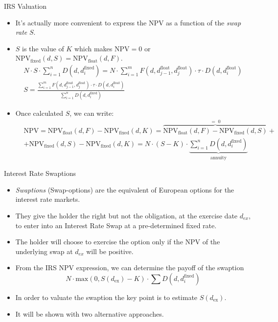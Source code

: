 \documentclass{beamer}
\begin{document}
\begin{frame}{IRS Valuation}
	\begin{itemize}	
	\item It's actually more convenient to express the NPV as a function of the \emph{swap rate} $S$.
	\item $S$ is the value of $K$ which makes $\mathrm{NPV}=0$ or 		$\mathrm{NPV}_{\mathrm{fixed}}(d, S) = \mathrm{NPV}_{\mathrm{float}}(d, F)$.
	\begin{equation*}
		\begin{gathered}
		N\cdot S\cdot\sum_{i=1}^{n}D(d, d_{i}^{\mathrm{fixed}}) = N\cdot\sum_{i=1}^{m}F(d, d_{j-1}^{\mathrm{float}}, d_{j}^{\mathrm{float}}) \cdot\tau\cdot D(d, d_{i}^{\mathrm{float}})\\
		S=\frac{\sum_{i=1}^{m}F(d, d_{j-1}^{\mathrm{float}}, d_{j}^{\mathrm{float}}) \cdot \tau\cdot D(d, d_{i}^{\mathrm{float}})}{\sum_{i=1}^{n}D(d, d_i^{\mathrm{fixed}})}
		\end{gathered}
	\end{equation*}
	\item Once calculated $S$, we can write:
	\begin{align*}
	&\mathrm{NPV} = \mathrm{NPV}_{\mathrm{float}}(d, F) - \mathrm{NPV}_{\mathrm{fixed}}(d, K) = \overbrace{\mathrm{NPV}_{\mathrm{float}}(d, F) - \mathrm{NPV}_{\mathrm{fixed}}(d, S)}^{\mathrm{=\;0}} + \\& + \mathrm{NPV}_{\mathrm{fixed}}(d, S) - \mathrm{NPV}_{\mathrm{fixed}}(d, K) = N\cdot(S-K)\cdot\underbrace{\sum_{i=1}^{n}D(d, d_{i}^{\mathrm{fixed}})}_{\mathrm{annuity}}
	\end{align*}
	\end{itemize}
\end{frame}

\begin{frame}{Interest Rate Swaptions}
	\begin{itemize}
		\item \emph{Swaptions} (Swap-options) are the equivalent of European options for the interest rate markets.
		\item They give the holder the right but not the obligation, at the exercise date $d_{ex}$, to enter into an Interest Rate Swap at a pre-determined fixed rate.
		\item The holder will choose to exercise the option only if the NPV of the underlying swap at $d_{ex}$ will be positive.
		\item From the IRS NPV expression, we can determine the payoff of the swaption 
		\begin{equation*}
		N\cdot \mathrm{max}(0, S(d_{\mathrm{ex}}) - K)\cdot\sum D(d, d_i^{\mathrm{fixed}})
		\end{equation*}
		\item In order to valuate the swaption the key point is to estimate $S(d_{\mathrm{ex}})$. 
		\item It will be shown with two alternative approaches.
	\end{itemize}
\end{frame}
\end{document}
